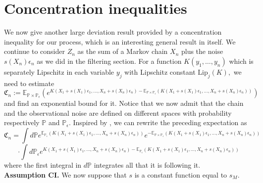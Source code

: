 \documentclass{article}
\DeclareMathOperator{\Leb}{Leb}
\newcommand{\1}{\mathbbm{1}}
\begin{document}
    \section{Concentration inequalities}\label{CI}
We now give another large deviation result provided by a concentration inequality for our process, which is an interesting  general result in itself. We continue to consider   $Z_n$ as the sum of a Markov chain $X_n$ plus the noise $s(X_n)\epsilon_n$ as we did in the filtering section.
 For a function $K(y_1,\dots,y_n)$ which is separately Lipschitz in each variable $y_j$  with Lipschitz constant $\text{Lip}_j(K),$ we need  to estimate
$$
\mathfrak{C}_n:=\mathbb{E}_{\mathbb{P}\times\mathbb{P}_{\epsilon}}\left(e^{K(X_1+s(X_1)\epsilon_1,\dots,X_n+s(X_n)\epsilon_n)-\mathbb{E}_{\mathbb{P}\times\mathbb{P}_{\epsilon}}(K(X_1+s(X_1)\epsilon_1,\dots,X_n+s(X_n)\epsilon_n))}\right)
$$
and find an exponential bound for it. Notice that we now admit that the chain and the observational noise are defined on different spaces with probability respectively $\mathbb{P}$ and $\mathbb{P}_{\epsilon}.$ Inspired by \cite{maldonado}, we can rewrite the preceding expectation as 
$$
\mathfrak{C}_n=\int d\mathbb{P}e^{\mathbb{E}_{\mathbb{P}_{\epsilon}}(K(X_1+s(X_1)\epsilon_1,\dots,X_n+s(X_n)\epsilon_n))}e^{-\mathbb{E}_{\mathbb{P}\times\mathbb{P}_{\epsilon}}(K(X_1+s(X_1)\epsilon_1,\dots,X_n+s(X_n)\epsilon_n))}
$$
$$
\cdot\int d\mathbb{P}_{\epsilon}e^{K(X_1+s(X_1)\epsilon_1,\dots,X_n+s(X_n)\epsilon_n)-\mathbb{E}_{\mathbb{P}_{\epsilon}}(K(X_1+s(X_1)\epsilon_1,\dots,X_n+s(X_n)\epsilon_n))}
$$
where the first integral in $d\mathbb P$ integrates all that it is following it. \\

{\bf Assumption CI.} We now suppose that $s$ is  a constant function equal to $s_M.$ \\
\end{document}
